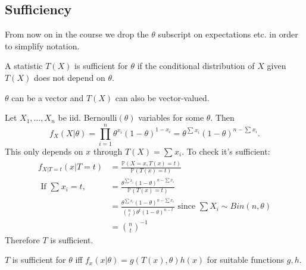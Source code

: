 \documentclass[egregdoesnotlikesansseriftitles,a4paper]{scrartcl}
\begin{document}
\subsection{Sufficiency}
\begin{notation}
     From now on in the course we drop the $\theta$ subscript on expectations etc. in order to simplify notation.
\end{notation}
\begin{definition*}[Sufficiency]
     A statistic $T (X)$ is sufficient for $\theta$ if the conditional distribution of $X$ given $T (X)$ does not depend on $\theta$.
\end{definition*}
\begin{remark}
      $\theta$ can be a vector and $T (X)$ can also be vector-valued.
\end{remark}
\begin{example*}
      Let $X_1 , \ldots ,X_n$ be iid. Bernoulli$(\theta)$  variables for some $\theta$. Then \[
      f_{X}(X|\theta)=\prod_{i=1}^n \theta^{x_{i}}(1-\theta)^{1-x_{i}}=\theta^{\sum_{}^{}x_{i}} (1-\theta)^{n-\sum_{}^{}x_{i}}
      .\] This only depends on $x$ through $T (X)=\sum_{}^{}x_{i}$. To check it's sufficient: 
      \begin{align*}
           f_{X|T=t}(x|T=t)&= \frac{\mathbb{P}(X=x, T (x)=t)}{\mathbb{P} (T (x)=t)}\\
           \text{ If } \sum_{}^{}x_i =t, \quad &= \frac{\theta^{\sum x_i}(1-\theta)^{n-\sum x_i}}{\mathbb{P}(T (x)=t)}\\
           &= \frac{\theta^{\sum x_i}(1-\theta)^{n-\sum x_i}}{{n \choose t}\theta^{t}(1-\theta)^{n-t}} \text{ since } \sum X_i \sim Bin (n,\theta)\\
           &= {n \choose t}^{-1}
      \end{align*}
      Therefore $T$ is sufficient.
\end{example*}
\begin{theorem}
     $T$ is sufficient for $\theta$ iff $f_{x}(x| \theta)=g (T (x), \theta)h (x)$ for suitable functions $g,h$.
\end{theorem}
\end{document}
